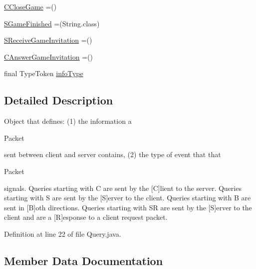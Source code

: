 \begin{DoxyCompactItemize}
\item 
\hyperlink{enumpt_1_1up_1_1fe_1_1lpro1613_1_1sharedlib_1_1conn_1_1_query_a5d1ed333957b4a3453303db0341aac29}{C\+Close\+Game} =()
\item 
\hyperlink{enumpt_1_1up_1_1fe_1_1lpro1613_1_1sharedlib_1_1conn_1_1_query_aca594101e00b7d1c778971dbc57ef432}{S\+Game\+Finished} =(String.\+class)
\item 
\hyperlink{enumpt_1_1up_1_1fe_1_1lpro1613_1_1sharedlib_1_1conn_1_1_query_ac7b851d120b1903b63a14053166ca2a8}{S\+Receive\+Game\+Invitation} =()
\item 
\hyperlink{enumpt_1_1up_1_1fe_1_1lpro1613_1_1sharedlib_1_1conn_1_1_query_a05335746d2327f5ad8b977eb6d491635}{C\+Answer\+Game\+Invitation} =()
\item 
final Type\+Token \hyperlink{enumpt_1_1up_1_1fe_1_1lpro1613_1_1sharedlib_1_1conn_1_1_query_a60697d643fb2c864d73b2ebc73573325}{info\+Type}
\end{DoxyCompactItemize}


\subsection{Detailed Description}
Object that defines\+: (1) the information a
\begin{DoxyCode}
Packet 
\end{DoxyCode}
 sent between client and server contains, (2) the type of event that that
\begin{DoxyCode}
Packet 
\end{DoxyCode}
 signals. Queries starting with \textquotesingle{}C\textquotesingle{} are sent by the \mbox{[}C\mbox{]}lient to the server. Queries starting with \textquotesingle{}S\textquotesingle{} are sent by the \mbox{[}S\mbox{]}erver to the client. Queries starting with \textquotesingle{}B\textquotesingle{} are sent in \mbox{[}B\mbox{]}oth directions. Queries starting with \textquotesingle{}SR\textquotesingle{} are sent by the \mbox{[}S\mbox{]}erver to the client and are a \mbox{[}R\mbox{]}esponse to a client request packet. 

Definition at line 22 of file Query.\+java.



\subsection{Member Data Documentation}
\hypertarget{enumpt_1_1up_1_1fe_1_1lpro1613_1_1sharedlib_1_1conn_1_1_query_aa5301799b1d3143c374798784ac198ea}{}\label{enumpt_1_1up_1_1fe_1_1lpro1613_1_1sharedlib_1_1conn_1_1_query_aa5301799b1d3143c374798784ac198ea} 

